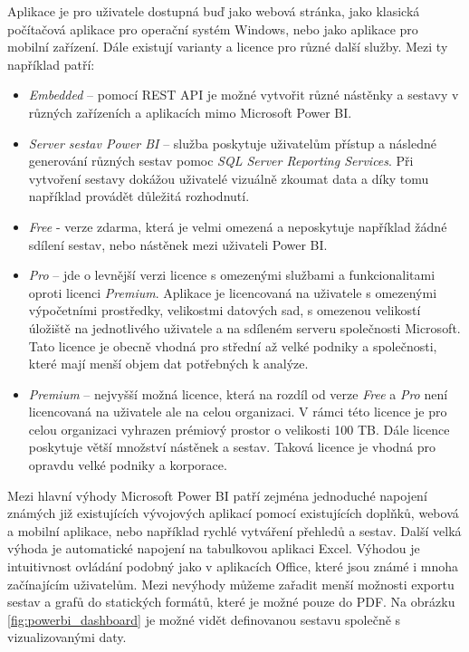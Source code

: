 \documentclass[czech,master,public,dept460,male,cpdeclaration,oneside]{diploma}
\begin{document}
Aplikace je pro uživatele dostupná buď jako webová stránka, jako klasická počítačová aplikace pro operační systém Windows, nebo jako aplikace pro mobilní zařízení. Dále existují varianty a licence pro různé další služby. Mezi ty například patří: \cite{ref:microsoft_bi_general}
\begin{itemize}
\item \textit{Embedded} -- pomocí REST API je možné vytvořit různé nástěnky a sestavy v různých zařízeních a aplikacích mimo Microsoft Power BI.
\item \textit{Server sestav Power BI} -- služba poskytuje uživatelům přístup a následné generování různých sestav pomoc \textit{SQL Server Reporting Services}. Při vytvoření sestavy dokážou uživatelé vizuálně zkoumat data a díky tomu například provádět důležitá rozhodnutí.
\item \textit{Free} - verze zdarma, která je velmi omezená a neposkytuje například žádné sdílení sestav, nebo nástěnek mezi uživateli Power BI.
\item \textit{Pro} -- jde o levnější verzi licence s omezenými službami a funkcionalitami oproti licenci \textit{Premium}. Aplikace je licencovaná na uživatele s omezenými výpočetními prostředky, velikostmi datových sad, s omezenou velikostí úložiště na jednotlivého uživatele a na sdíleném serveru společnosti Microsoft. Tato licence je obecně vhodná pro střední až velké podniky a společnosti, které mají menší objem dat potřebných k analýze.
\item \textit{Premium} -- nejvyšší možná licence, která na rozdíl od verze \textit{Free} a \textit{Pro} není licencovaná na uživatele ale na celou organizaci. V rámci této licence je pro celou organizaci vyhrazen prémiový prostor o velikosti 100 TB. Dále licence poskytuje větší množství nástěnek a sestav. Taková licence je vhodná pro opravdu velké podniky a korporace.
\end{itemize}

Mezi hlavní výhody Microsoft Power BI patří zejména jednoduché napojení známých již existujících vývojových aplikací pomocí existujících doplňků, webová a mobilní aplikace, nebo například rychlé vytváření přehledů a sestav. \cite{ref:microsoft_bi_general} Další velká výhoda je automatické napojení na tabulkovou aplikaci Excel. Výhodou je intuitivnost ovládání podobný jako v aplikacích Office, které jsou známé i mnoha začínajícím uživatelům. Mezi nevýhody můžeme zařadit menší možnosti exportu sestav a grafů do statických formátů, které je možné pouze do PDF. Na obrázku \ref{fig:powerbi_dashboard} je možné vidět definovanou sestavu společně s vizualizovanými daty.
\end{document}
